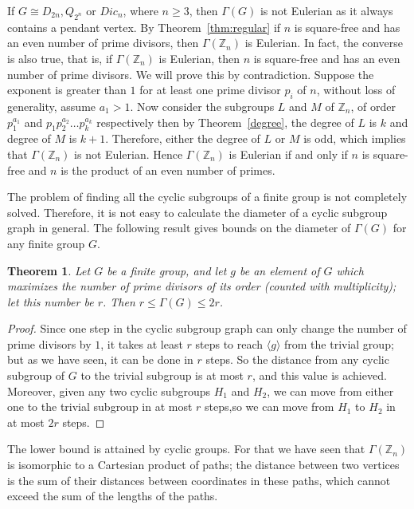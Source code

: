\documentclass[11pt,twoside]{amsart}
\def \Z {{\mathbb{Z}}}
\def \Ga {{\Gamma }}
\newtheorem{theorem}{Theorem}[section]
\begin{document}
If $G\cong D_{2n}, Q_{2^n}$ or $Dic_n$, where $n\geq 3$, then $\Gamma (G)$ is not Eulerian as it always contains a pendant vertex. By Theorem~\ref{thm:regular}\; if $n$ is square-free and has an even number of prime divisors, then $\Ga(\Z_n)$ is Eulerian. In fact, the converse is also true, that is, if  $\Ga(\Z_n)$ is Eulerian, then $n$ is square-free and has an even number of prime divisors. We will prove this by contradiction. Suppose the exponent is greater than $1$ for at least one prime divisor $p_i$ of $n$, without loss of generality, assume $a_1> 1$. Now consider the subgroups $L$ and $M$ of $\Z_n$, of order $p_1^{a_1}$ and $p_1p_2^{a_2}\dots p_k^{a_k}$ respectively then by Theorem~\ref{degree}, the degree of $L$ is $k$ and degree of $M$ is $k+1$. Therefore, either the degree of $L$ or $M$ is odd, which implies that $\Gamma (\Z_{n})$ is not Eulerian. Hence $\Gamma (\Z_{n})$ is Eulerian if and only if $n$ is square-free and $n$ is the product of an even number of primes.


       The problem of finding all the cyclic subgroups of a finite group is not completely solved. Therefore, it is not easy to calculate the diameter of a cyclic subgroup graph in general. The following result gives bounds on the diameter of $\Ga (G)$ for any finite group $G$.

\begin{theorem}
Let $G$ be a finite group, and let $g$ be an element of $G$ which maximizes the
number of prime divisors of its order (counted with multiplicity); let this
number be $r$. Then $r\le\Ga(G)\le 2r$.
\label{t:diambound}
\end{theorem}

\begin{proof}
Since one step in the cyclic subgroup graph can only change the number of prime
divisors by $1$, it takes at least $r$ steps to reach $\langle g\rangle$ from
the trivial group; but as we have seen, it can be done in $r$ steps. So the
distance from any cyclic subgroup of $G$ to the trivial subgroup is at most $r$,
and this value is achieved. Moreover, given any two cyclic subgroups $H_1$ and
$H_2$, we can move from either one to the trivial subgroup in at most $r$ steps,so we can move from $H_1$ to $H_2$ in at most $2r$ steps. 
\end{proof}

The lower bound is attained by cyclic groups. For that we have seen that $\Ga(\Z_n)$
is isomorphic to a Cartesian product of paths; the distance between two
vertices is the sum of their distances between coordinates in these
paths, which cannot exceed the sum of the lengths of the paths.
\end{document}
